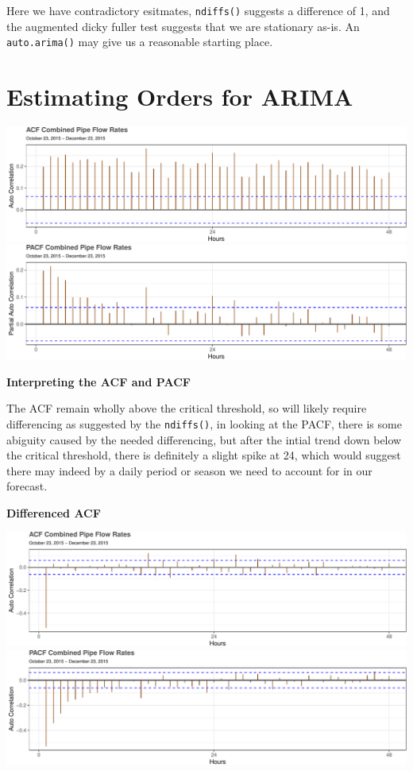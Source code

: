 \documentclass[openany]{book}
\begin{document}
Here we have contradictory esitmates, \texttt{ndiffs()} suggests a
difference of 1, and the augmented dicky fuller test suggests that we
are stationary as-is. An \texttt{auto.arima()} may give us a reasonable
starting place.

\hypertarget{estimating-orders-for-arima}{%
\section{Estimating Orders for
ARIMA}\label{estimating-orders-for-arima}}

\includegraphics{Part-C-BP_files/figure-latex/unnamed-chunk-5-1.pdf}
\includegraphics{Part-C-BP_files/figure-latex/unnamed-chunk-5-2.pdf}

\textbf{Interpreting the ACF and PACF}

The ACF remain wholly above the critical threshold, so will likely
require differencing as suggested by the \texttt{ndiffs()}, in looking
at the PACF, there is some abiguity caused by the needed differencing,
but after the intial trend down below the critical threshold, there is
definitely a slight spike at 24, which would suggest there may indeed by
a daily period or season we need to account for in our forecast.

\newpage

\textbf{Differenced ACF}

\includegraphics{Part-C-BP_files/figure-latex/unnamed-chunk-6-1.pdf}
\includegraphics{Part-C-BP_files/figure-latex/unnamed-chunk-6-2.pdf}
\end{document}
